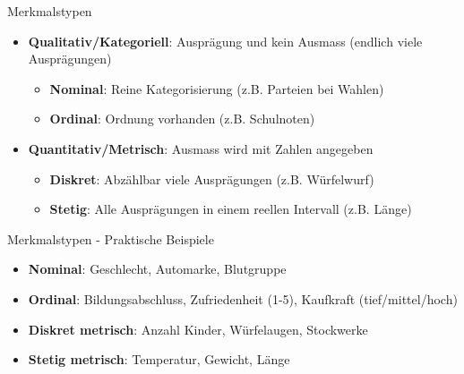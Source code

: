 \begin{concept}{Merkmalstypen}
\begin{itemize}
    \item \textbf{Qualitativ/Kategoriell}: Ausprägung und kein Ausmass (endlich viele Ausprägungen)
    \begin{itemize}
        \item \textbf{Nominal}: Reine Kategorisierung (z.B. Parteien bei Wahlen)
        \item \textbf{Ordinal}: Ordnung vorhanden (z.B. Schulnoten)
    \end{itemize}
    \item \textbf{Quantitativ/Metrisch}: Ausmass wird mit Zahlen angegeben
    \begin{itemize}
        \item \textbf{Diskret}: Abzählbar viele Ausprägungen (z.B. Würfelwurf)
        \item \textbf{Stetig}: Alle Ausprägungen in einem reellen Intervall (z.B. Länge)
    \end{itemize}
\end{itemize}
\end{concept}

\begin{example2}{Merkmalstypen - Praktische Beispiele}
\begin{itemize}
    \item \textbf{Nominal}: Geschlecht, Automarke, Blutgruppe
    \item \textbf{Ordinal}: Bildungsabschluss, Zufriedenheit (1-5), Kaufkraft (tief/mittel/hoch)
    \item \textbf{Diskret metrisch}: Anzahl Kinder, Würfelaugen, Stockwerke
    \item \textbf{Stetig metrisch}: Temperatur, Gewicht, Länge
\end{itemize}
\end{example2}

